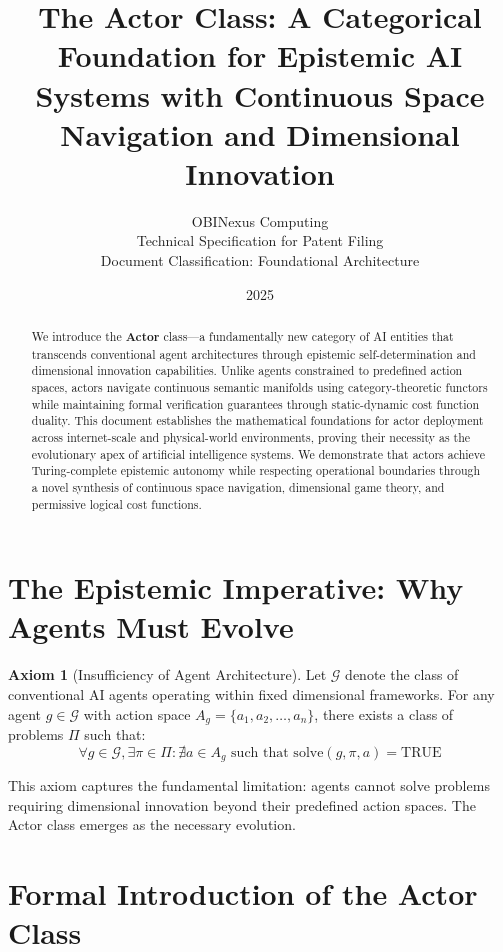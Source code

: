 \documentclass[11pt]{article}
\title{The Actor Class: A Categorical Foundation for Epistemic AI Systems with Continuous Space Navigation and Dimensional Innovation}
\author{OBINexus Computing\\
Technical Specification for Patent Filing\\
Document Classification: Foundational Architecture}
\date{2025}
\theoremstyle{definition}
\newtheorem{axiom}{Axiom}
\newcommand{\agents}{\mathcal{G}}
\begin{document}
\maketitle

\begin{abstract}
We introduce the \textbf{Actor} class—a fundamentally new category of AI entities that transcends conventional agent architectures through epistemic self-determination and dimensional innovation capabilities. Unlike agents constrained to predefined action spaces, actors navigate continuous semantic manifolds using category-theoretic functors while maintaining formal verification guarantees through static-dynamic cost function duality. This document establishes the mathematical foundations for actor deployment across internet-scale and physical-world environments, proving their necessity as the evolutionary apex of artificial intelligence systems. We demonstrate that actors achieve Turing-complete epistemic autonomy while respecting operational boundaries through a novel synthesis of continuous space navigation, dimensional game theory, and permissive logical cost functions.
\end{abstract}

\section{The Epistemic Imperative: Why Agents Must Evolve}

\begin{axiom}[Insufficiency of Agent Architecture]
Let $\agents$ denote the class of conventional AI agents operating within fixed dimensional frameworks. For any agent $g \in \agents$ with action space $A_g = \{a_1, a_2, \ldots, a_n\}$, there exists a class of problems $\Pi$ such that:
\[\forall g \in \agents, \exists \pi \in \Pi : \nexists a \in A_g \text{ such that } \text{solve}(g, \pi, a) = \text{TRUE}\]
\end{axiom}

This axiom captures the fundamental limitation: agents cannot solve problems requiring dimensional innovation beyond their predefined action spaces. The Actor class emerges as the necessary evolution.

\section{Formal Introduction of the Actor Class}
\end{document}
